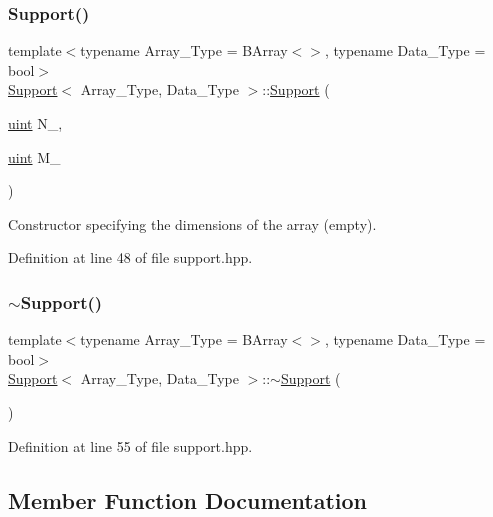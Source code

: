 \subsubsection{\texorpdfstring{Support()}{Support()}\hspace{0.1cm}{\footnotesize\ttfamily [2/2]}}
{\footnotesize\ttfamily template$<$typename Array\+\_\+\+Type = B\+Array$<$$>$, typename Data\+\_\+\+Type = bool$>$ \\
\hyperlink{class_support}{Support}$<$ Array\+\_\+\+Type, Data\+\_\+\+Type $>$\+::\hyperlink{class_support}{Support} (\begin{DoxyParamCaption}\item[{\hyperlink{typedefs_8hpp_a91ad9478d81a7aaf2593e8d9c3d06a14}{uint}}]{N\+\_\+,  }\item[{\hyperlink{typedefs_8hpp_a91ad9478d81a7aaf2593e8d9c3d06a14}{uint}}]{M\+\_\+ }\end{DoxyParamCaption})\hspace{0.3cm}{\ttfamily [inline]}}



Constructor specifying the dimensions of the array (empty). 



Definition at line 48 of file support.\+hpp.

\mbox{\label{class_support_a03228371869980fa356b7b86871d94e8}} 
\subsubsection{\texorpdfstring{$\sim$\+Support()}{~Support()}}
{\footnotesize\ttfamily template$<$typename Array\+\_\+\+Type = B\+Array$<$$>$, typename Data\+\_\+\+Type = bool$>$ \\
\hyperlink{class_support}{Support}$<$ Array\+\_\+\+Type, Data\+\_\+\+Type $>$\+::$\sim$\hyperlink{class_support}{Support} (\begin{DoxyParamCaption}{ }\end{DoxyParamCaption})\hspace{0.3cm}{\ttfamily [inline]}}



Definition at line 55 of file support.\+hpp.



\subsection{Member Function Documentation}
\mbox{\label{class_support_a0ad8bb6202451253697d771a28859210}} 
